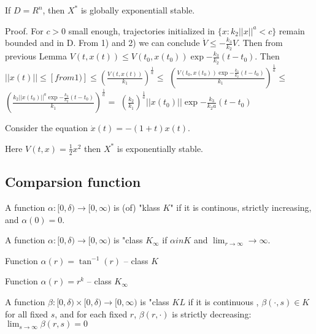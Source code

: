  If $D=R^n$, then $X^*$ is globally exponentiall stable.

 Proof. For $c>0$ small enough, trajectories initialized in $\{x:k_2||x||^a<c\}$
 remain bounded and in D. From 1) and 2) we can conclude 
 $\dot V \le -\frac{k_3}{k_2}V$. Then from previous Lemma 
 $V(t,x(t)) \le V(t_0,x(t_0))\exp{-\frac{k_3}{k_2}(t-t_0)}$. Then
 $||x(t)|| \le [from 1)] \le \left( \frac{V(t,x(t))}{k_1}\right)^{\frac{1}{a}} \le$
 $\left(\frac{V(t_0,x(t_0))\exp{-\frac{k_3}{k_2}(t-t_0)}}{k_1}\right)^{\frac{1}{a}} \le$ 
 $\left(\frac{k_2||x(t_0)||^a\exp{-\frac{k_3}{k_2}(t-t_0)}}{k_1}\right)^{\frac{1}{a}} =$
 $\left( \frac{k_2}{k_1}\right)^{\frac{1}{a}} ||x(t_0)||\exp{-\frac{k_3}{k_2a}(t-t_0)}$

 Consider the equation $\dot x(t) = -(1+t)x(t)$.

 Here $V(t,x)=\frac{1}{2}x^2$ then $X^*$  is exponentially stable.


\subsection{Comparsion function}

 A function $\alpha:[0,\delta)\to [0, \infty)$ is (of) "klass $K$" if it is continous,
 strictly increasing, and $\alpha(0)=0$.

 A function $\alpha:[0,\delta)\to [0, \infty)$ is "class $K_\infty$ if $\alpha in K$
 and $\lim_{r\to\infty} \to\infty$.


 Function $\alpha(r)=\tan^{-1}(r)$ -- class $K$

 Function $\alpha(r)=r^k$ -- class $K_\infty$

 A function $\beta:[0,\delta)\times[0,\delta)\to [0, \infty)$ is "class $KL$ if it is continuous
 , $\beta(\cdot, s) \in K$ for all fixed $s$, and for each fixed $r$, $\beta(r, \cdot)$ is
 strictly decreasing: $\lim_{s\to\infty}\beta(r,s)=0$


